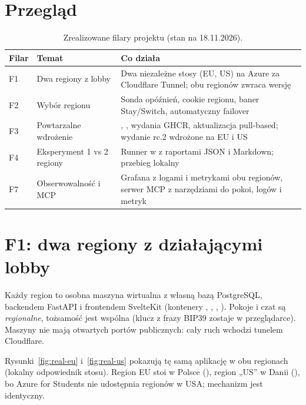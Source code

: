 \section{Przegląd}
\begin{table}[H]
\centering\footnotesize
\renewcommand{\arraystretch}{1.25}
\begin{tabularx}{\textwidth}{@{}l>{\raggedright\arraybackslash}p{}Y@{}}
\toprule
\textbf{Filar} & \textbf{Temat} & \textbf{Co działa} \\
\midrule
F1 & Dwa regiony z lobby & Dwa niezależne stosy (EU, US) na Azure za Cloudflare Tunnel;  obu regionów zwraca wersję  \\
F2 & Wybór regionu & Sonda opóźnień, cookie regionu, baner Stay/Switch, automatyczny failover \\
F3 & Powtarzalne wdrożenie & , , wydania GHCR, aktualizacja pull-based; wydanie rc.2 wdrożone na EU i US \\
F4 & Eksperyment 1 vs 2 regiony & Runner w  z raportami JSON i Markdown; przebieg lokalny \\
F7 & Obserwowalność i MCP & Grafana z logami i metrykami obu regionów, serwer MCP z narzędziami do pokoi, logów i metryk \\
\bottomrule
\end{tabularx}
\caption{Zrealizowane filary projektu (stan na 18.11.2026).}
\end{table}

\section{F1: dwa regiony z działającymi lobby}
Każdy region to osobna maszyna wirtualna z własną bazą PostgreSQL, backendem FastAPI i frontendem
SvelteKit (kontenery , , , ). Pokoje i czat są
\emph{regionalne}, tożsamość jest wspólna (klucz z frazy BIP39 zostaje w przeglądarce). Maszyny nie mają
otwartych portów publicznych: cały ruch wchodzi tunelem Cloudflare.


Rysunki~\ref{fig:real-eu} i~\ref{fig:real-us} pokazują tę samą aplikację w obu regionach (lokalny odpowiednik
stosu). Region EU stoi w Polsce (), region „US'' w Danii (), bo Azure
for Students nie udostępnia regionów w USA; mechanizm jest identyczny.

